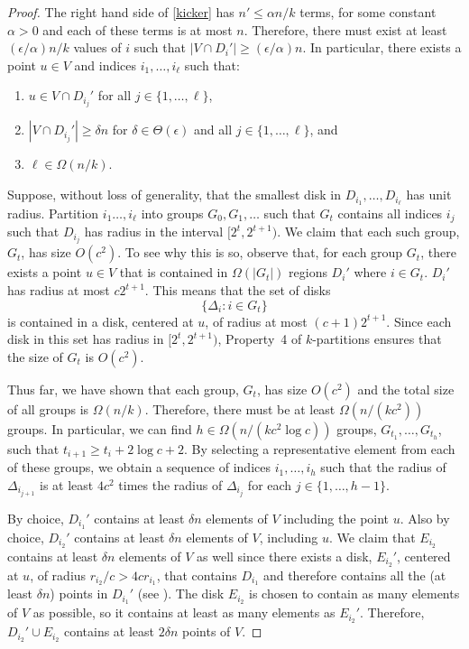 \documentclass{patmorin}
\begin{document}
\begin{proof}
  The right hand side of \eqref{kicker} has $n'\le \alpha n/k$
  terms, for some constant $\alpha >0$ and each of these terms
  is at most $n$.  Therefore, there must exist at least
  $(\epsilon/\alpha)n/k$ values of $i$ such that $|V\cap D_i'|\ge
  (\epsilon/\alpha)n$.  In particular, there exists a point $u\in V$
  and indices $i_1,\ldots,i_\ell$ such that:
  \begin{enumerate}
     \item $u\in V\cap D_{i_j}'$ for all $j\in\{1,\ldots,\ell\}$,
     \item $|V\cap D_{i_j}'|\ge \delta n$ for $\delta\in\Theta(\epsilon)$
       and all $j\in\{1,\ldots,\ell\}$, and
     \item $\ell\in\Omega(n/k)$.
  \end{enumerate}

  Suppose, without loss of generality, that the smallest disk
  in $D_{i_1},\ldots,D_{i_\ell}$ has unit radius.  Partition
  $i_1\ldots,i_\ell$ into groups $G_0,G_1,\ldots$ such that $G_t$
  contains all indices $i_j$ such that $D_{i_j}$ has radius in the
  interval $[2^t,2^{t+1})$.
  We claim that each such group, $G_t$, has size $O(c^2)$.  To see
  why this is so, observe that, for each group $G_t$, there exists a
  point $u\in V$ that is contained in $\Omega(|G_t|)$ regions $D_{i}'$
  where $i\in G_t$.  $D_{i}'$ has radius at most $c2^{t+1}$.  This means
  that the set of disks
  \[
     \{ \Delta_i : i\in G_t\}
  \]
  is contained in a disk, centered at $u$, of radius at most
  $(c+1)2^{t+1}$.  Since each disk in this set has radius in
  $[2^t,2^{t+1})$, Property~4 of $k$-partitions ensures that the size
  of $G_t$ is $O(c^2)$.

  Thus far, we have shown that each group, $G_t$, has size $O(c^2)$
  and the total size of all groups is $\Omega(n/k)$.
  Therefore, there must be at least $\Omega(n/(kc^2))$ groups.
  In particular, we can find $h\in\Omega(n/(kc^2\log c))$ groups,
  $G_{t_1},\ldots,G_{t_h}$, such that $t_{i+1} \ge
  t_{i}+2\log c+2$.  By selecting a representative element from each
  of these groups, we obtain a sequence of indices $i_1,\ldots,i_h$
  such that the radius of $\Delta_{i_{j+1}}$ is at least $4c^2$ times the
  radius of $\Delta_{i_j}$ for each $j\in\{1,\ldots,h-1\}$.

  By choice, $D_{i_1}'$ contains at least $\delta n$ elements of $V$
  including the point $u$.  Also by choice, $D_{i_2}'$ contains at least
  $\delta n$ elements of $V$, including $u$.  We claim that $E_{i_2}$
  contains at least $\delta n$ elements of $V$ as well since there
  exists a disk, $E_{i_2}'$, centered at $u$, of radius $r_{i_2}/c >
  4cr_{i_1}$, that contains $D_{i_1}$ and therefore contains all the
  (at least $\delta n$) points in $D_{i_1}'$ (see ).
  The disk $E_{i_2}$ is chosen to contain as many elements of $V$ as
  possible, so it contains at least as many elements as $E_{i_2}'$.
  Therefore, $D_{i_2}'\cup E_{i_2}$ contains at least $2\delta n$
  points of $V$.


\end{proof}
\end{document}
